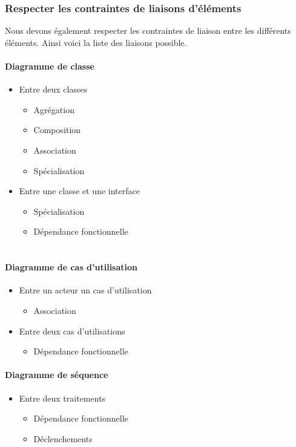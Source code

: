 \documentclass[12pt,a4paper,openany]{report}
\begin{document}
		\subsubsection{Respecter les contraintes de liaisons d'éléments}
		Nous devons également respecter les contraintes de liaison entre les différents éléments. Ainsi voici la liste des liaisons possible.
		\begin{multicols}{2}
		\paragraph{Diagramme de classe}	
		\begin{itemize}
			\item Entre deux classes
				\begin{itemize}
					\item Agrégation
					\item Composition
					\item Association
					\item Spécialisation
				\end{itemize}
			\item Entre une classe et une interface
				\begin{itemize}
					\item Spécialisation
					\item Dépendance fonctionnelle 
						\\ \\
				\end{itemize}
		\end{itemize}
		\paragraph{Diagramme de cas d'utilisation}	
		\begin{itemize}
			\item Entre un acteur un cas d'utilisation
				\begin{itemize}
					\item Association
				\end{itemize}
			\item Entre deux cas d'utilisations
				\begin{itemize}
					\item Dépendance fonctionnelle
				\end{itemize}
		\end{itemize}
		\paragraph{Diagramme de séquence}
		\begin{itemize}
			\item Entre deux traitements
				\begin{itemize}
					\item Dépendance fonctionnelle
					\item Déclenchements
				\end{itemize}
		\end{itemize}
		\end{multicols}
\end{document}
